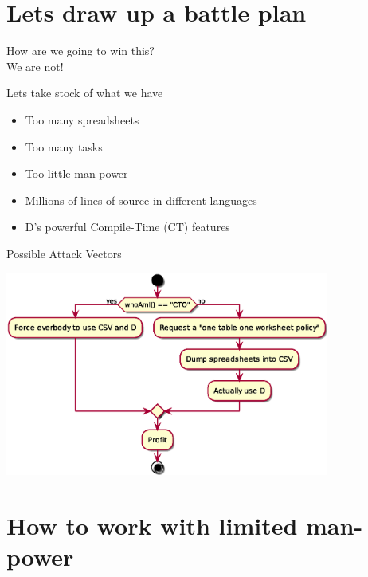 \documentclass[aspectratio=169,notes]{beamer}
\begin{document}
	\section{Lets draw up a battle plan}

	\begin{frame}{\mbox{}}
		\begin{center}
			\huge
			How are we going to win this?\\[2cm]
			\pause
			We are not!
		\end{center}
	\end{frame}

	\begin{frame}{Lets take stock of what we have}
		\begin{itemize}
			\item Too many spreadsheets \pause \CheckmarkBold
			\item Too many tasks \pause \CheckmarkBold
			\item Too little man-power \pause \CheckmarkBold
			\item Millions of lines of source in different languages \pause \CheckmarkBold
			\item D's powerful Compile-Time (CT) features \pause \CheckmarkBold
		\end{itemize}
	\end{frame}

	\begin{frame}{Possible Attack Vectors}
		\begin{center}
		\includegraphics[width=0.8\textwidth]{attackvectors.eps}
		\end{center}
	\end{frame}

	\section{How to work with limited man-power}
\end{document}
